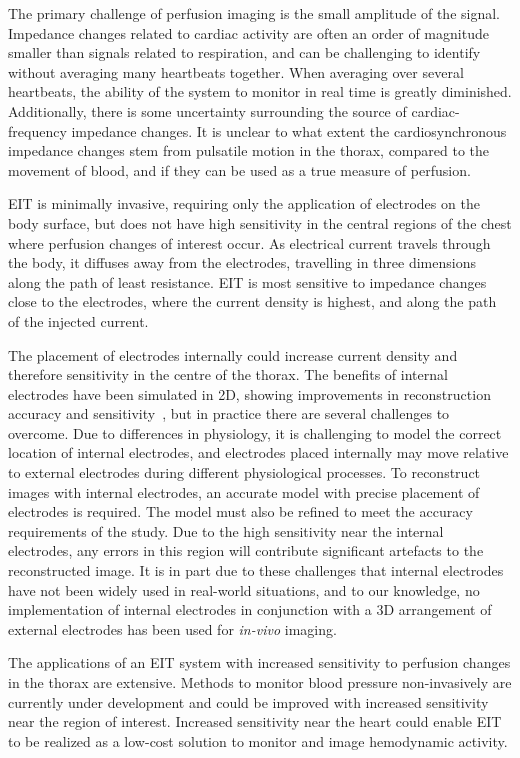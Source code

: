The primary challenge of perfusion imaging is the small amplitude of the signal. 
Impedance changes related to cardiac activity are often an order of
magnitude smaller than signals related to respiration, 
and can be challenging to identify without 
averaging many heartbeats together. When 
averaging over several heartbeats, the ability of the system to 
monitor in real time is greatly diminished. Additionally,
there is some uncertainty surrounding the source of
cardiac-frequency impedance changes. It is unclear to what 
extent the cardiosynchronous impedance changes stem from pulsatile
motion in the thorax, compared to the movement of blood, 
and if they can be used as a true measure of perfusion. 

EIT is minimally invasive, requiring only 
the application of electrodes on the body surface, but 
does not have high sensitivity in the central regions 
of the chest where perfusion changes of interest occur.
As electrical current travels through the body, it diffuses away from 
the electrodes,
travelling in three dimensions along the path of least resistance. 
EIT is most sensitive to impedance changes close to the electrodes,
where the current density is highest, 
and along the path of the injected current.

The placement of electrodes internally
could increase current density and therefore sensitivity in 
the centre of the thorax. 
The benefits of internal electrodes have been simulated 
in 2D, showing improvements in reconstruction accuracy 
and sensitivity~\parencite{nasehi_tehrani_modelling_2012}, but 
in practice there are several challenges to overcome. 
Due to differences in physiology, it is challenging to model
the correct location of internal electrodes,
and electrodes placed internally may move relative
to external electrodes during different physiological
processes.  
To reconstruct images with internal electrodes, 
an accurate model with precise placement of electrodes is required.
The model must also be refined 
to meet the accuracy requirements of the study.
Due to the high sensitivity near the internal electrodes, any errors in this region 
will contribute significant artefacts to the reconstructed image.
It is in part due to these challenges that internal electrodes 
have not been widely used in real-world situations, and to our knowledge,
no implementation of internal electrodes in conjunction 
with a 3D arrangement of external electrodes has been used for \emph{in-vivo}
imaging.

The applications of an EIT system with increased sensitivity to perfusion changes
in the thorax are extensive. Methods to monitor blood pressure non-invasively are 
currently under development and could be improved with increased sensitivity 
near the region of interest. Increased sensitivity near the heart 
could enable EIT to be realized as a low-cost solution to monitor and image
hemodynamic activity.  

